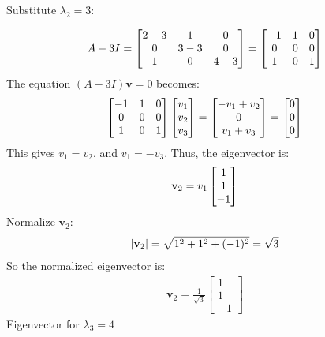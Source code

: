 Substitute $\lambda_2 = 3$:

\begin{align}
    A - 3I = \begin{bmatrix}
    2 - 3 & 1 & 0 \\
    0 & 3 - 3 & 0 \\
    1 & 0 & 4 - 3
    \end{bmatrix} = \begin{bmatrix}
    -1 & 1 & 0 \\
    0 & 0 & 0 \\
    1 & 0 & 1
    \end{bmatrix}\notag
\end{align}
The equation $(A - 3I) \mathbf{v} = 0$ becomes:
\begin{align}
    \begin{bmatrix}
    -1 & 1 & 0 \\
    0 & 0 & 0 \\
    1 & 0 & 1
    \end{bmatrix} \begin{bmatrix}
    v_1 \\
    v_2 \\
    v_3
    \end{bmatrix} = \begin{bmatrix}
    -v_1 + v_2 \\
    0 \\
    v_1 + v_3
    \end{bmatrix} = \begin{bmatrix}
    0 \\
    0 \\
    0
    \end{bmatrix}\notag
\end{align}
This gives $v_1 = v_2$, and $v_1 = -v_3$. Thus, the eigenvector is:
\begin{align}
    \mathbf{v}_2 = v_1 \begin{bmatrix}
    1 \\
    1 \\
    -1
    \end{bmatrix}\notag
\end{align}
Normalize $\mathbf{v}_2$:
\begin{align}
    |\mathbf{v}_2| = \sqrt{1^2 + 1^2 + (-1)^2} = \sqrt{3}\notag
\end{align}
So the normalized eigenvector is:
\begin{align}
    \mathbf{v}_2 = \frac{1}{\sqrt{3}} \begin{bmatrix}
    1 \\
    1 \\
    -1
    \end{bmatrix}
\end{align}
Eigenvector for $\lambda_3 = 4$

